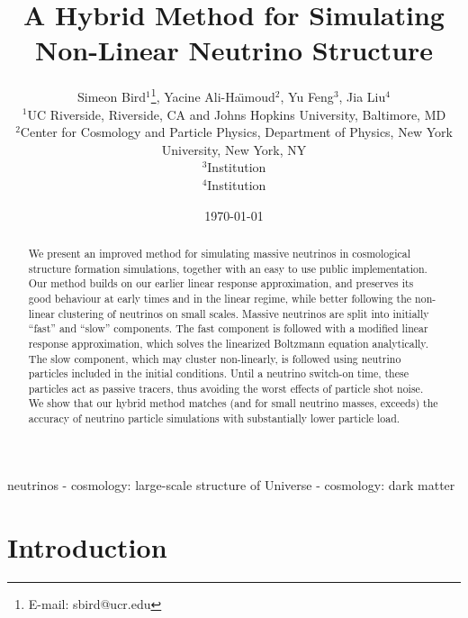 \documentclass[useAMS, usenatbib]{mnras}
\begin{document}
\title{A Hybrid Method for Simulating Non-Linear Neutrino Structure}
\author[ S. Bird et al.]{Simeon Bird$^1$\thanks{E-mail: sbird@ucr.edu}, Yacine Ali-Ha\"{\i}moud$^2$, Yu Feng$^3$, Jia Liu$^4$\vspace{1.5mm}\\
$^1$UC Riverside, Riverside, CA  and Johns Hopkins University, Baltimore, MD\\
$^2$Center for Cosmology and Particle Physics, Department of Physics,
New York University, New York, NY\\
$^3$Institution\\
$^4$Institution}

\date{\today}

\pagerange{\pageref{firstpage}--\pageref{lastpage}} 
\label{firstpage}

\maketitle

\begin{abstract}
We present an improved method for simulating massive neutrinos in cosmological structure formation simulations, together with an easy to use public implementation.
Our method builds on our earlier linear response approximation, and preserves its good behaviour at early times and in the linear regime, while better following the non-linear clustering of neutrinos on small scales. Massive neutrinos are split into initially ``fast'' and ``slow'' components. The fast component is followed with a modified linear response approximation, which solves the linearized Boltzmann equation analytically. The slow component, which may cluster non-linearly, is followed using neutrino particles included in the initial conditions. Until a neutrino switch-on time, these particles act as passive tracers, thus avoiding the worst effects of particle shot noise. We show that our hybrid method matches (and for small neutrino masses, exceeds) the accuracy of neutrino particle simulations with substantially lower particle load.
\end{abstract}

\begin{keywords}
        neutrinos - cosmology: large-scale structure of Universe - cosmology: dark matter
\end{keywords}

\section{Introduction}
\end{document}
